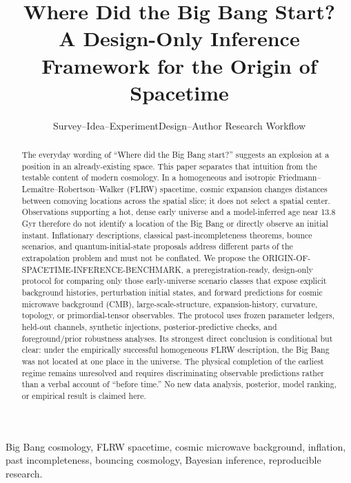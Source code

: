 \documentclass[10pt,conference]{IEEEtran}
\begin{document}
\title{Where Did the Big Bang Start?\\
A Design-Only Inference Framework for the Origin of Spacetime}

\author{Survey--Idea--ExperimentDesign--Author Research Workflow}

\maketitle

\begin{abstract}
The everyday wording of ``Where did the Big Bang start?'' suggests an explosion at a position in an already-existing space. This paper separates that intuition from the testable content of modern cosmology. In a homogeneous and isotropic Friedmann--Lema\^itre--Robertson--Walker (FLRW) spacetime, cosmic expansion changes distances between comoving locations across the spatial slice; it does not select a spatial center. Observations supporting a hot, dense early universe and a model-inferred age near 13.8 Gyr therefore do not identify a location of the Big Bang or directly observe an initial instant. Inflationary descriptions, classical past-incompleteness theorems, bounce scenarios, and quantum-initial-state proposals address different parts of the extrapolation problem and must not be conflated. We propose the ORIGIN-OF-SPACETIME-INFERENCE-BENCHMARK, a preregistration-ready, design-only protocol for comparing only those early-universe scenario classes that expose explicit background histories, perturbation initial states, and forward predictions for cosmic microwave background (CMB), large-scale-structure, expansion-history, curvature, topology, or primordial-tensor observables. The protocol uses frozen parameter ledgers, held-out channels, synthetic injections, posterior-predictive checks, and foreground/prior robustness analyses. Its strongest direct conclusion is conditional but clear: under the empirically successful homogeneous FLRW description, the Big Bang was not located at one place in the universe. The physical completion of the earliest regime remains unresolved and requires discriminating observable predictions rather than a verbal account of ``before time.'' No new data analysis, posterior, model ranking, or empirical result is claimed here.
\end{abstract}

\begin{IEEEkeywords}
Big Bang cosmology, FLRW spacetime, cosmic microwave background, inflation, past incompleteness, bouncing cosmology, Bayesian inference, reproducible research.
\end{IEEEkeywords}
\end{document}
